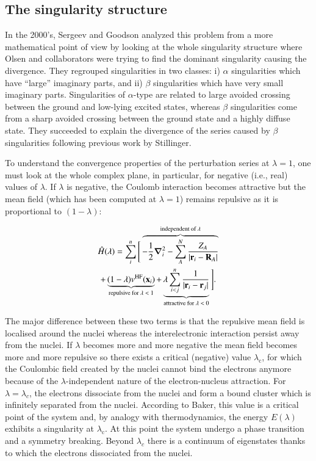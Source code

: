 \documentclass[aps,prb,reprint,noshowkeys,linenumbers,superscriptaddress]{revtex4-1}
\newcommand{\latin}[1]{#1}
\newcommand{\ie}{\latin{i.e.}}
\newcommand{\hH}{\Hat{H}}
\begin{document}
\subsection{The singularity structure}
In the 2000's, Sergeev and Goodson \cite{Sergeev_2005, Sergeev_2006} analyzed this problem from a more mathematical point of view by looking at the whole singularity structure where Olsen and collaborators were trying to find the dominant singularity causing the divergence. \cite{Olsen_1996,Olsen_2000,Olsen_2019}
They regrouped singularities in two classes: i) $\alpha$ singularities which have ``large'' imaginary parts, and ii) $\beta$ singularities which have very small imaginary parts. 
Singularities of $\alpha$-type are related to large avoided crossing between the ground and low-lying excited states, whereas $\beta$ singularities come from a sharp avoided crossing between the ground state and a highly diffuse state. 
They succeeded to explain the divergence of the series caused by $\beta$ singularities following previous work by Stillinger. \cite{Stillinger_2000}

To understand the convergence properties of the perturbation series at $\lambda=1$, one must look at the whole complex plane, in particular, for negative (\ie, real) values of $\lambda$. 
If $\lambda$ is negative, the Coulomb interaction becomes attractive but the mean field (which has been computed at $\lambda = 1$) remains repulsive as it is proportional to $(1-\lambda)$:

\begin{multline}
\label{eq:HamiltonianStillinger}
    \hH(\lambda) = 
    \sum_{i}^{n} \Bigg[ 
    \overbrace{-\frac{1}{2}\grad_i^2 
    - \sum_{A}^{N} \frac{Z_A}{\abs{\vb{r}_i-\vb{R}_A}}}^{\text{independent of $\lambda$}}
    \\
    + \underbrace{(1-\lambda)v^{\text{HF}}(\vb{x}_i)}_{\text{repulsive for $\lambda < 1$}}
    + \underbrace{\lambda\sum_{i<j}^{n}\frac{1}{|\vb{r}_i-\vb{r}_j|}}_{\text{attractive for $\lambda < 0$}}
    \Bigg].
\end{multline}

The major difference between these two terms is that the repulsive mean field is localised around the nuclei whereas the interelectronic interaction persist away from the nuclei. 
If $\lambda$ becomes more and more negative the mean field becomes more and more repulsive so there exists a critical (negative) value $\lambda_\text{c}$, for which the Coulombic field created by the nuclei cannot bind the electrons anymore because of the $\lambda$-independent nature of the electron-nucleus attraction. 
For $\lambda = \lambda_c$, the electrons dissociate from the nuclei and form a bound cluster which is infinitely separated from the nuclei. 
According to Baker, \cite{Baker_1971} this value is a critical point of the system and, by analogy with thermodynamics, the energy $E(\lambda)$ exhibits a singularity at $\lambda_\text{c}$. 
At this point the system undergo a phase transition and a symmetry breaking. 
Beyond $\lambda_c$ there is a continuum of eigenstates thanks to which the electrons dissociated from the nuclei.
\end{document}
